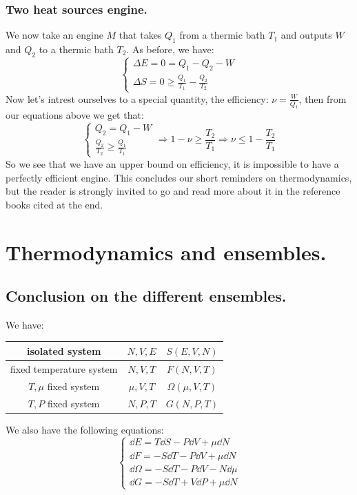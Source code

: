 \documentclass[10pt,a4paper]{book}
\begin{document}
\subsubsection{Two heat sources engine.}
We now take an engine $M$ that takes $Q_1$ from a thermic bath $T_1$ and outputs $W$ and $Q_2$ to a thermic bath $T_2$. As before, we have:
\[
\begin{cases}
\Delta E = 0 = Q_1 - Q_2 - W\\
\Delta S = 0 \geq \frac{Q_1}{T_1} - \frac{Q_2}{T_2}
\end{cases}
\]
Now let's intrest ourselves to a special quantity, the efficiency: $\nu = \frac{W}{Q_1}$, then from our equations above we get that:
\[
\begin{cases}
Q_2 = Q_1 - W\\
\frac{Q_2}{T_2} \geq  \frac{Q_1}{T_1}
\end{cases}
\Rightarrow 1 - \nu \geq \frac{T_2}{T_1} \Rightarrow \nu \leq 1 - \frac{T_2}{T_1}
\]
So we see that we have an upper bound on efficiency, it is impossible to have a perfectly efficient engine. This concludes our short reminders on thermodynamics, but the reader is strongly invited to go and read more about it in the reference books cited at the end.

\section{Thermodynamics and ensembles.}
\subsection{Conclusion on the different ensembles.}
We have:
\begin{center}
\begin{tabular}{c | c | c |}
isolated system & $N, V, E$ & $S(E,V, N)$\\
\hline
fixed temperature system & $N, V, T$ & $F(N, V, T)$\\
\hline
$T, \mu$ fixed system & $\mu, V, T$ & $\Omega(\mu, V, T)$\\
\hline
$T, P$ fixed system & $N, P, T$ & $G(N, P, T)$\\
\hline
\end{tabular}
\end{center}
We also have the following equations:
\[
\begin{cases}
\dd E = T \dd S - P \dd V + \mu \dd N\\
\dd F = - S \dd T - P \dd V + \mu \dd N\\
\dd \Omega = - S \dd T - P \dd V - N \dd \mu\\
\dd G = - S \dd T + V \dd P + \mu \dd N
\end{cases}
\]
\end{document}
